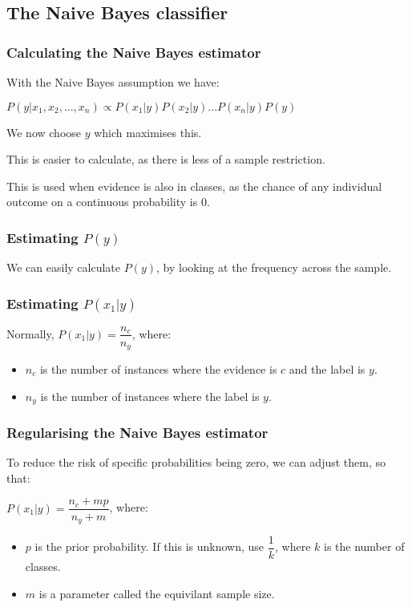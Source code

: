 
\subsection{The Naive Bayes classifier}

\subsubsection{Calculating the Naive Bayes estimator}

With the Naive Bayes assumption we have:

\(P(y|x_1,x_2,...,x_n)\propto P(x_1|y)P(x_2|y)...P(x_n|y)P(y)\)

We now choose \(y\) which maximises this.

This is easier to calculate, as there is less of a sample restriction.

This is used when evidence is also in classes, as the chance of any individual outcome on a continuous probability is \(0\).

\subsubsection{Estimating \(P(y)\)}

We can easily calculate \(P(y)\), by looking at the frequency across the sample.

\subsubsection{Estimating \(P(x_1|y)\)}

Normally, \(P(x_1|y)=\dfrac{n_c}{n_y}\), where:

\begin{itemize}
\item \(n_c\) is the number of instances where the evidence is \(c\) and the label is \(y\).
\item \(n_y\) is the number of instances where the label is \(y\).
\end{itemize}

\subsubsection{Regularising the Naive Bayes estimator}

To reduce the risk of specific probabilities being zero, we can adjust them, so that:

\(P(x_1|y)=\dfrac{n_c+mp}{n_y+m}\), where:

\begin{itemize}
\item \(p\) is the prior probability. If this is unknown, use \(\dfrac{1}{k}\), where \(k\) is the number of classes.
\item \(m\) is a parameter called the equivilant sample size.
\end{itemize}

